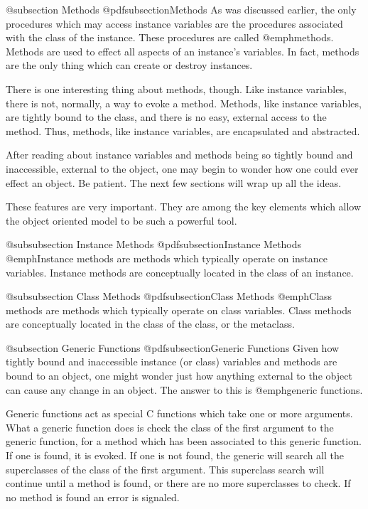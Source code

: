 @subsection Methods
@pdfsubsection{Methods}
As was discussed earlier, the only procedures which may access instance
variables are the procedures associated with the class of the instance.
These procedures are called @emph{methods}.  Methods are used to effect
all aspects of an instance's variables.  In fact, methods are the only
thing which can create or destroy instances.

There is one interesting thing about methods, though.  Like instance
variables, there is not, normally, a way to evoke a method.  Methods,
like instance variables, are tightly bound to the class, and there is
no easy, external access to the method.  Thus, methods, like instance
variables, are encapsulated and abstracted.

After reading about instance variables and methods being so tightly
bound and inaccessible, external to the object, one may begin to wonder
how one could ever effect an object.  Be patient.  The next few sections
will wrap up all the ideas.

These features are very important.  They are among the key elements
which allow the object oriented model to be such a powerful tool.

@subsubsection Instance Methods
@pdfsubsection{Instance Methods}
@emph{Instance methods} are methods which typically operate on instance
variables.  Instance methods are conceptually located in the class of
an instance.

@subsubsection Class Methods
@pdfsubsection{Class Methods}
@emph{Class methods} are methods which typically operate on class
variables.  Class methods are conceptually located in the class of
the class, or the metaclass.

@subsection Generic Functions
@pdfsubsection{Generic Functions}
Given how tightly bound and inaccessible instance (or class) variables and
methods are bound to an object, one might wonder just how anything external
to the object can cause any change in an object.  The answer to this is
@emph{generic functions}.

Generic functions act as special C functions which take one or more
arguments.  What a generic function does is check the class of the first
argument to the generic function, for a method which has been associated
to this generic function.  If one is found, it is evoked.  If one is not
found, the generic will search all the superclasses of the class of
the first argument.  This superclass search will continue until a method
is found, or there are no more superclasses to check.  If no method
is found an error is signaled.

